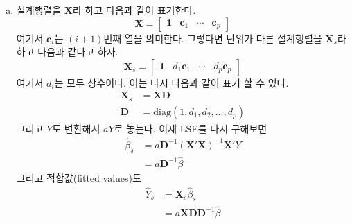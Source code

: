 \documentclass[answers]{exam}
\begin{document}
\begin{questions}
\begin{solution}
\begin{enumerate}[(a)]
\begin{align}
          &=1-\dfrac{\sum_{i=1}^{n}\left(y_{i}-\overline{y}\right)^{2}-2\widehat{\beta}_{1}\sum_{i=1}^{n}\left(x_{i}-\overline{x}\right)\left(y_{i}-\overline{y}\right)+\widehat{\beta}_{1}^{2}\sum_{i=1}^{n}\left(x_{i}-\overline{x}\right)^{2}}{\sum_{i=1}^{n}\left(y_{i}-\overline{y}\right)^{2}}\\
          &=\dfrac{\left(\sum_{i=1}^{n}\left(x_{i}-\overline{x}\right)\left(y_{i}-\overline{y}\right)\right)^{2}}{\sum_{i=1}^{n}\left(y_{i}-\overline{y}\right)^{2}\sum_{i=1}^{n}\left(x_{i}-\overline{x}\right)^{2}}\\
          &=\mathrm{Cor}^{2}\left(X,Y\right)
        \end{align}
        (40)에서 (41)로 넘어갈 때 $\widehat{\beta}_{1}$을 넣는다.
        \item 설계행렬을 $\mathbf{X}$라 하고 다음과 같이 표기한다.
        \begin{equation}
          \mathbf{X}= \begin{bmatrix}\mathbf{1}& \mathbf{c}_{1} & \cdots & \mathbf{c}_{p}  \end{bmatrix}
        \end{equation}
        여기서 $\mathbf{c}_{i}$는 $(i+1)$번째 열을 의미한다. 그렇다면 단위가 다른 설계행렬을 $\mathbf{X}_{s}$라 하고 다음과 같다고 하자.
        \begin{equation}
          \mathbf{X}_{s}= \begin{bmatrix}\mathbf{1}& d_{1}\mathbf{c}_{1} & \cdots & d_{p}\mathbf{c}_{p}  \end{bmatrix}
        \end{equation}
        여기서 $d_{i}$는 모두 상수이다. 이는 다시 다음과 같이 표기 할 수 있다.
        \begin{align}
          \mathbf{X}_{s}&= \mathbf{XD}\\
          \mathbf{D} &= \mathrm{diag}\left(1, d_{1},d_{2},\ldots ,d_{p}\right)
        \end{align}
        그리고 $Y$도 변환해서 $aY$로 놓는다. 이제 LSE를 다시 구해보면
        \begin{align}
          \widehat{\beta}_{s} &= a\mathbf{D}^{-1}\left(\mathbf{X}'\mathbf{X}\right)^{-1}\mathbf{X}'Y\\
          &=a\mathbf{D}^{-1}\widehat{\beta}
        \end{align}
        그리고 적합값(fitted values)도
        \begin{align}
          \widehat{Y}_{s} &= \mathbf{X}_{s}\widehat{\beta}_{s}\\
          &=a\mathbf{XDD}^{-1}\widehat{\beta}\\

\end{align}
\end{enumerate}
\end{solution}
\end{questions}
\end{document}
